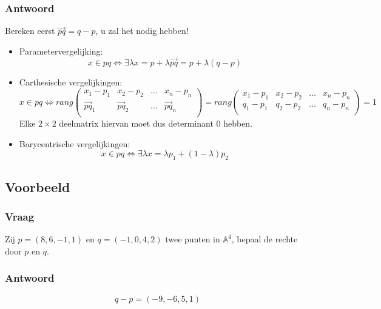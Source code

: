 \documentclass[main.tex]{subfiles}
\begin{document}
\subsubsection{Antwoord}
Bereken eerst $\overrightarrow{pq}= q-p$, u zal het nodig hebben!
\begin{itemize}
\item Parametervergelijking:
  \[
  x\in pq \Leftrightarrow \exists \lambda
  x = p + \lambda \overrightarrow{pq} = p + \lambda (q-p)
  \]
\item Carthesische vergelijkingen:
  \[
  x\in pq \Leftrightarrow
  rang
  \begin{pmatrix}
    x_{1}-p_{1} & x_{2}-p_{2} & \hdots & x_{n}-p_{n}\\
    \overrightarrow{pq}_{1} & \overrightarrow{pq}_{2} & \hdots & \overrightarrow{pq}_{n}\\
  \end{pmatrix}
  =
  rang
  \begin{pmatrix}
    x_{1}-p_{1} & x_{2}-p_{2} & \hdots & x_{n}-p_{n}\\
    q_{1}-p_{1} & q_{2}-p_{2} & \hdots & q_{n}-p_{n}\\
  \end{pmatrix}
  = 1
  \]
  Elke $2\times 2$ deelmatrix hiervan moet dus determinant $0$ hebben.
\item Barycentrische vergelijkingen:
  \[
  x\in pq \Leftrightarrow \exists \lambda
  x = \lambda p_{1} + (1-\lambda)p_{2}
  \]
\end{itemize}

\subsection{Voorbeeld}
\subsubsection{Vraag}
\begin{center}
  Zij $p=(8,6,-1,1)$ en $q=(-1,0,4,2)$ twee punten in $\mathbb{A}^{4}$, bepaal de rechte door $p$ en $q$.
\end{center}

\subsubsection{Antwoord}
\[ q-p= (-9,-6,5,1) \]
\end{document}
